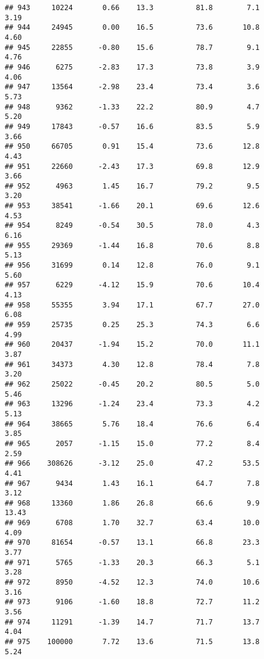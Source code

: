\documentclass[
]{article}
\begin{document}
\begin{verbatim}
## 943     10224       0.66    13.3          81.8        7.1              3.19
## 944     24945       0.00    16.5          73.6       10.8              4.60
## 945     22855      -0.80    15.6          78.7        9.1              4.76
## 946      6275      -2.83    17.3          73.8        3.9              4.06
## 947     13564      -2.98    23.4          73.4        3.6              5.73
## 948      9362      -1.33    22.2          80.9        4.7              5.20
## 949     17843      -0.57    16.6          83.5        5.9              3.66
## 950     66705       0.91    15.4          73.6       12.8              4.43
## 951     22660      -2.43    17.3          69.8       12.9              3.66
## 952      4963       1.45    16.7          79.2        9.5              3.20
## 953     38541      -1.66    20.1          69.6       12.6              4.53
## 954      8249      -0.54    30.5          78.0        4.3              6.16
## 955     29369      -1.44    16.8          70.6        8.8              5.13
## 956     31699       0.14    12.8          76.0        9.1              5.60
## 957      6229      -4.12    15.9          70.6       10.4              4.13
## 958     55355       3.94    17.1          67.7       27.0              6.08
## 959     25735       0.25    25.3          74.3        6.6              4.99
## 960     20437      -1.94    15.2          70.0       11.1              3.87
## 961     34373       4.30    12.8          78.4        7.8              3.20
## 962     25022      -0.45    20.2          80.5        5.0              5.46
## 963     13296      -1.24    23.4          73.3        4.2              5.13
## 964     38665       5.76    18.4          76.6        6.4              3.85
## 965      2057      -1.15    15.0          77.2        8.4              2.59
## 966    308626      -3.12    25.0          47.2       53.5              4.41
## 967      9434       1.43    16.1          64.7        7.8              3.12
## 968     13360       1.86    26.8          66.6        9.9             13.43
## 969      6708       1.70    32.7          63.4       10.0              4.09
## 970     81654      -0.57    13.1          66.8       23.3              3.77
## 971      5765      -1.33    20.3          66.3        5.1              3.28
## 972      8950      -4.52    12.3          74.0       10.6              3.16
## 973      9106      -1.60    18.8          72.7       11.2              3.56
## 974     11291      -1.39    14.7          71.7       13.7              4.04
## 975    100000       7.72    13.6          71.5       13.8              5.24

\end{verbatim}
\end{document}
